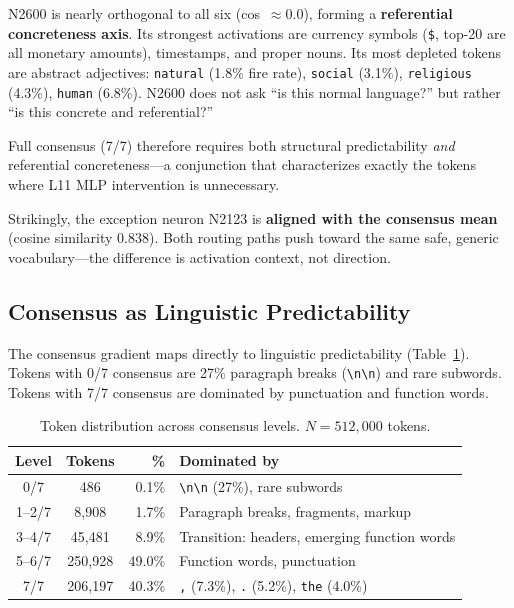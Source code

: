 \documentclass{article}
\begin{document}
N2600 is nearly orthogonal to all six (cos~$\approx 0.0$), forming a
\textbf{referential concreteness axis}.
Its strongest activations are currency symbols (\texttt{\$}, top-20 are all
monetary amounts), timestamps, and proper nouns.
Its most depleted tokens are abstract adjectives: \texttt{natural} (1.8\% fire
rate), \texttt{social} (3.1\%), \texttt{religious} (4.3\%), \texttt{human}
(6.8\%).
N2600 does not ask ``is this normal language?'' but rather ``is this
concrete and referential?''

Full consensus (7/7) therefore requires both structural predictability
\emph{and} referential concreteness---a conjunction that characterizes exactly
the tokens where L11 MLP intervention is unnecessary.

Strikingly, the exception neuron N2123 is \textbf{aligned with the consensus
mean} (cosine similarity 0.838).
Both routing paths push toward the same safe, generic vocabulary---the difference
is activation context, not direction.

\subsection{Consensus as Linguistic Predictability}

The consensus gradient maps directly to linguistic predictability
(Table~\ref{tab:consensus_levels}).
Tokens with 0/7 consensus are 27\% paragraph breaks (\texttt{\textbackslash n\textbackslash n})
and rare subwords.
Tokens with 7/7 consensus are dominated by punctuation and function words.

\begin{table}[t]
\centering
\caption{Token distribution across consensus levels. $N = 512{,}000$ tokens.}
\label{tab:consensus_levels}
\begin{tabular}{@{}ccrl@{}}
\toprule
Level & Tokens & \% & Dominated by \\
\midrule
0/7   & 486       & 0.1\%  & \texttt{\textbackslash n\textbackslash n} (27\%), rare subwords \\
1--2/7 & 8,908    & 1.7\%  & Paragraph breaks, fragments, markup \\
3--4/7 & 45,481   & 8.9\%  & Transition: headers, emerging function words \\
5--6/7 & 250,928  & 49.0\% & Function words, punctuation \\
7/7   & 206,197   & 40.3\% & \texttt{,} (7.3\%), \texttt{.} (5.2\%), \texttt{the} (4.0\%) \\
\bottomrule
\end{tabular}
\end{table}
\end{document}

